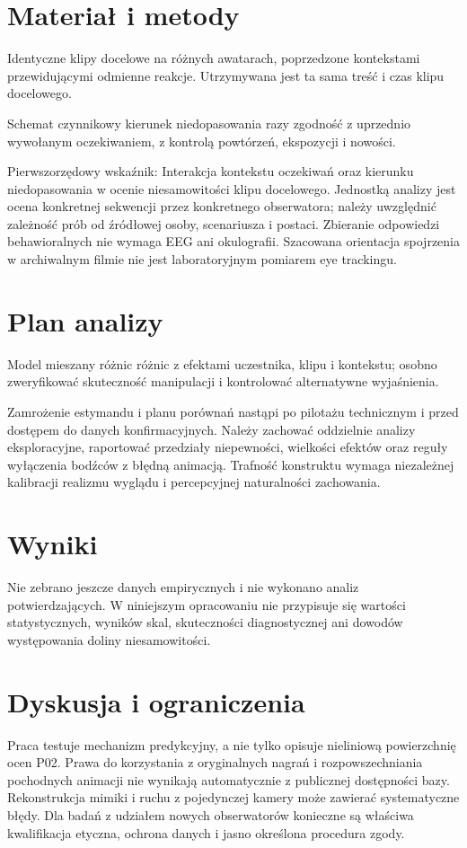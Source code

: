 \documentclass[11pt,a4paper]{article}
\begin{document}
\section{Materiał i metody}
Identyczne klipy docelowe na różnych awatarach, poprzedzone kontekstami przewidującymi odmienne reakcje. Utrzymywana jest ta sama treść i czas klipu docelowego.

Schemat czynnikowy kierunek niedopasowania razy zgodność z uprzednio wywołanym oczekiwaniem, z kontrolą powtórzeń, ekspozycji i nowości.

Pierwszorzędowy wskaźnik: Interakcja kontekstu oczekiwań oraz kierunku niedopasowania w ocenie niesamowitości klipu docelowego. Jednostką analizy jest ocena konkretnej sekwencji przez konkretnego obserwatora; należy uwzględnić zależność prób od źródłowej osoby, scenariusza i postaci. Zbieranie odpowiedzi behawioralnych nie wymaga EEG ani okulografii. Szacowana orientacja spojrzenia w archiwalnym filmie nie jest laboratoryjnym pomiarem eye trackingu.
\section{Plan analizy}
Model mieszany różnic różnic z efektami uczestnika, klipu i kontekstu; osobno zweryfikować skuteczność manipulacji i kontrolować alternatywne wyjaśnienia.

Zamrożenie estymandu i planu porównań nastąpi po pilotażu technicznym i przed dostępem do danych konfirmacyjnych. Należy zachować oddzielnie analizy eksploracyjne, raportować przedziały niepewności, wielkości efektów oraz reguły wyłączenia bodźców z błędną animacją. Trafność konstruktu wymaga niezależnej kalibracji realizmu wyglądu i percepcyjnej naturalności zachowania.
\section{Wyniki}
Nie zebrano jeszcze danych empirycznych i nie wykonano analiz potwierdzających. W niniejszym opracowaniu nie przypisuje się wartości statystycznych, wyników skal, skuteczności diagnostycznej ani dowodów występowania doliny niesamowitości.
\section{Dyskusja i ograniczenia}
Praca testuje mechanizm predykcyjny, a nie tylko opisuje nieliniową powierzchnię ocen P02. Prawa do korzystania z oryginalnych nagrań i rozpowszechniania pochodnych animacji nie wynikają automatycznie z publicznej dostępności bazy. Rekonstrukcja mimiki i ruchu z pojedynczej kamery może zawierać systematyczne błędy. Dla badań z udziałem nowych obserwatorów konieczne są właściwa kwalifikacja etyczna, ochrona danych i jasno określona procedura zgody.
\end{document}
